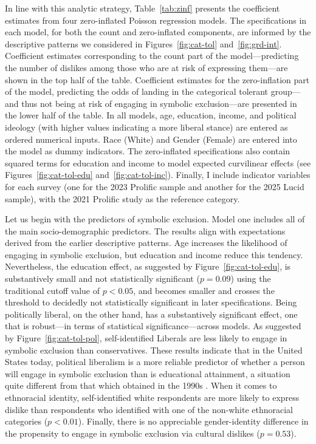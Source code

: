 \documentclass[12pt]{article}
\begin{document}
In line with this analytic strategy, Table~\ref{tab:zinf} presents the coefficient estimates from four zero-inflated Poisson regression models. The specifications in each model, for both the count and zero-inflated components, are informed by the descriptive patterns we considered in Figures~\ref{fig:cat-tol} and~\ref{fig:grd-int}. Coefficient estimates corresponding to the count part of the model---predicting the number of dislikes among those who are at risk of expressing them---are shown in the top half of the table. Coefficient estimates for the zero-inflation part of the model, predicting the odds of landing in the categorical tolerant group---and thus not being at risk of engaging in symbolic exclusion---are presented in the lower half of the table. In all models, age, education, income, and political ideology (with higher values indicating a more liberal stance) are entered as ordered numerical inputs. Race (White) and Gender (Female) are entered into the model as dummy indicators. The zero-inflated specifications also contain squared terms for education and income to model expected curvilinear effects (see Figures~\ref{fig:cat-tol-edu} and~\ref{fig:cat-tol-inc}). Finally, I include indicator variables for each survey (one for the 2023 Prolific sample and another for the 2025 Lucid sample), with the 2021 Prolific study as the reference category. 

Let us begin with the predictors of symbolic exclusion. Model one includes all of the main socio-demographic predictors. The results align with expectations derived from the earlier descriptive patterns. Age increases the likelihood of engaging in symbolic exclusion, but education and income reduce this tendency. Nevertheless, the education effect, as suggested by Figure~\ref{fig:cat-tol-edu}, is substantively small and not statistically significant ($p = 0.09$) using the traditional cutoff value of $p < 0.05$, and becomes smaller and crosses the threshold to decidedly not statistically significant in later specifications. Being politically liberal, on the other hand, has a substantively significant effect, one that is robust---in terms of statistical significance---across models. As suggested by Figure~\ref{fig:cat-tol-pol}, self-identified Liberals are less likely to engage in symbolic exclusion than conservatives. These results indicate that in the United States today, political liberalism is a more reliable predictor of whether a person will engage in symbolic exclusion than is educational attainment, a situation quite different from that which obtained in the 1990s \citep{bryson1996anything-311}. When it comes to ethnoracial identity, self-identified white respondents are more likely to express dislike than respondents who identified with one of the non-white ethnoracial categories ($p < 0.01$). Finally, there is no appreciable gender-identity difference in the propensity to engage in symbolic exclusion via cultural dislikes ($p = 0.53$).
\end{document}
